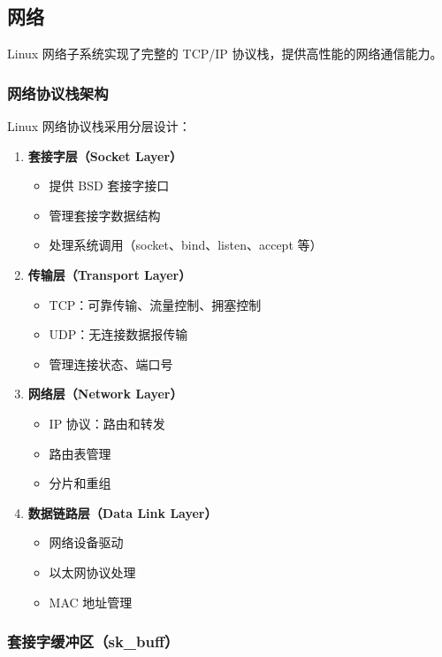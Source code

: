 \subsection{网络}

Linux 网络子系统实现了完整的 TCP/IP 协议栈，提供高性能的网络通信能力。

\subsubsection{网络协议栈架构}

Linux 网络协议栈采用分层设计：

\begin{enumerate}
  \item \textbf{套接字层（Socket Layer）}
    \begin{itemize}
      \item 提供 BSD 套接字接口
      \item 管理套接字数据结构
      \item 处理系统调用（socket、bind、listen、accept 等）
    \end{itemize}

  \item \textbf{传输层（Transport Layer）}
    \begin{itemize}
      \item TCP：可靠传输、流量控制、拥塞控制
      \item UDP：无连接数据报传输
      \item 管理连接状态、端口号
    \end{itemize}

  \item \textbf{网络层（Network Layer）}
    \begin{itemize}
      \item IP 协议：路由和转发
      \item 路由表管理
      \item 分片和重组
    \end{itemize}

  \item \textbf{数据链路层（Data Link Layer）}
    \begin{itemize}
      \item 网络设备驱动
      \item 以太网协议处理
      \item MAC 地址管理
    \end{itemize}
\end{enumerate}

\subsubsection{套接字缓冲区（sk\_buff）}

